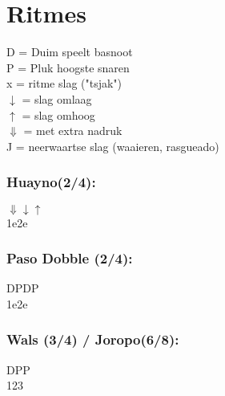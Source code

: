 \section{Ritmes}
	D = Duim speelt basnoot\\
	P = Pluk hoogste snaren\\
	x = ritme slag ("tsjak")\\
	$\downarrow$ = slag omlaag\\
	$\uparrow$ = slag omhoog\\	
	$\Downarrow$ = met extra nadruk\\
	J = neerwaartse slag (waaieren, rasgueado)\\ 
	
\subsubsection*{Huayno(2/4):}
$\Downarrow$\hspace{2em}\hphantom{a}\hspace{2em}$\downarrow$\hspace{2em}$\uparrow$\\
1\hspace{2em}e\hspace{2em}2\hspace{2em}e\\

\subsubsection*{Paso Dobble (2/4):}
D\hspace{1.8em}P\hspace{1.8em}D\hspace{1.9em}P\\
1\hspace{2em}e\hspace{2em}2\hspace{2em}e\\

\subsubsection*{Wals (3/4) / Joropo(6/8):}
D\hspace{1.8em}P\hspace{1.8em}P\\
1\hspace{2em}2\hspace{2em}3\\

